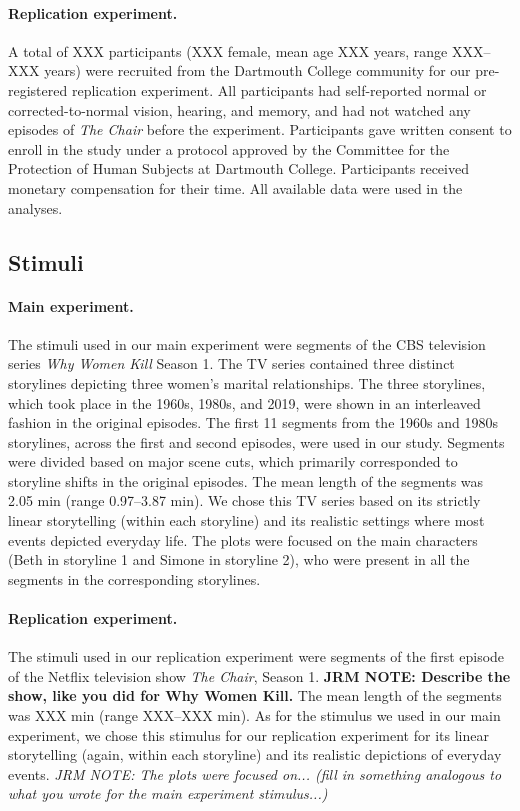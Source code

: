 \documentclass[10pt]{article}
\begin{document}
\paragraph*{Replication experiment.} A total of XXX participants (XXX female, mean age XXX years, range XXX--XXX years) were recruited from the Dartmouth College community for our pre-registered replication experiment. All participants had self-reported normal or corrected-to-normal vision, hearing, and memory, and had not watched any episodes of \textit{The Chair} before the experiment. Participants gave written consent to enroll in the study under a protocol approved by the Committee for the Protection of Human Subjects at Dartmouth College. Participants received monetary compensation for their time. All available data were used in the analyses. \subsection*{Stimuli}

\paragraph{Main experiment.} The stimuli used in our main experiment were segments of the CBS television series \textit{Why Women Kill} Season 1. The TV series contained three distinct storylines depicting three women’s marital relationships. The three storylines, which took place in the 1960s, 1980s, and 2019, were shown in an interleaved fashion in the original episodes. The first 11 segments from the 1960s and 1980s storylines, across the first and second episodes, were used in our study. Segments were divided based on major scene cuts, which primarily corresponded to storyline shifts in the original episodes. The mean length of the segments was 2.05 min (range 0.97--3.87 min). We chose this TV series based on its strictly linear storytelling (within each storyline) and its realistic settings where most events depicted everyday life. The plots were focused on the main characters (Beth in storyline 1 and Simone in storyline 2), who were present in all the segments in the corresponding storylines.

\paragraph{Replication experiment.} The stimuli used in our replication experiment were segments of the first episode of the Netflix television show \textit{The Chair}, Season 1. \textbf{JRM NOTE: Describe the show, like you did for Why Women Kill.} The mean length of the segments was XXX min (range XXX--XXX min). As for the stimulus we used in our main experiment, we chose this stimulus for our replication experiment for its linear storytelling (again, within each storyline) and its realistic depictions of everyday events. \textit{JRM NOTE: The plots were focused on... (fill in something analogous to what you wrote for the main experiment stimulus...)}
\end{document}
